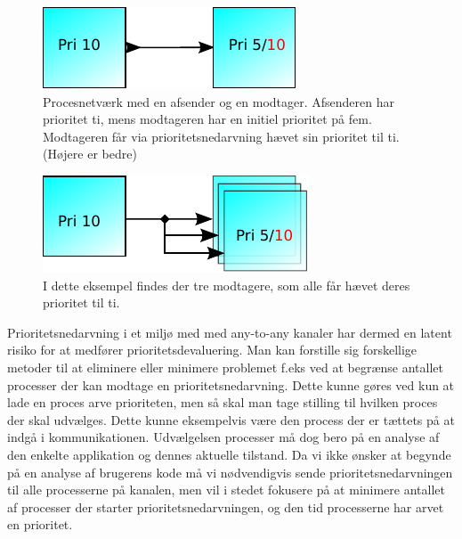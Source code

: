 \begin{figure}
 \begin{center}
  \includegraphics[scale=1.00]{images/one-to-one-inheritance}
\caption{Procesnetværk med en afsender og en modtager. Afsenderen har prioritet ti, mens modtageren har en initiel prioritet på fem. Modtageren  får via prioritetsnedarvning hævet sin prioritet til ti. (Højere er bedre)}
  \label{fig:one-to-one-inheritance}
  \end{center}
\end{figure}

\begin{figure}
 \begin{center}
  \includegraphics[scale=1.00]{images/any-to-any-inheritance}
  \caption{I dette eksempel findes der tre modtagere, som alle får hævet deres prioritet til ti.}
  \label{fig:any-to-any-inheritance}
  \end{center}
\end{figure}

 Prioritetsnedarvning i et miljø med med any-to-any kanaler har dermed en latent risiko for at medfører prioritetsdevaluering. Man kan forstille sig forskellige metoder til at eliminere eller minimere problemet f.eks ved at begrænse antallet processer der kan modtage en prioritetsnedarvning. Dette kunne gøres ved kun at lade en proces arve prioriteten,  men så skal man tage stilling til hvilken proces der skal udvælges. Dette kunne eksempelvis være den process der er tættets på at indgå i kommunikationen.  Udvælgelsen processer må dog bero på en analyse af den enkelte applikation og dennes aktuelle tilstand. Da vi ikke ønsker at  begynde på en analyse af  brugerens kode må vi nødvendigvis sende prioritetsnedarvningen til alle processerne på kanalen, men vil i stedet fokusere på at minimere antallet af processer der starter prioritetsnedarvningen, og den tid processerne har arvet en prioritet.

